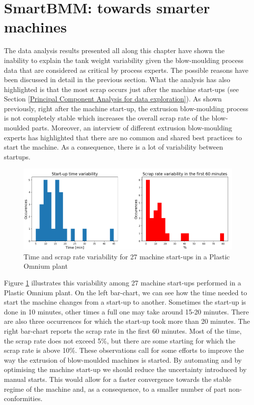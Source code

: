 \section{SmartBMM: towards smarter machines}

The data analysis results presented all along this chapter have shown the inability to explain the tank weight variability given the blow-moulding process data that are considered as critical by process experts. The possible reasons have been discussed in detail in the previous section. What the analysis has also highlighted is that the most scrap occurs just after the machine start-ups (see Section \ref{Principal Component Analysis for data exploration}). As shown previously, right after the machine start-up, the extrusion blow-moulding process is not completely stable which increases the overall scrap rate of the blow-moulded parts. Moreover, an interview of different extrusion blow-moulding experts has highlighted that there are no common and shared best practices to start the machine. As a consequence,  there is a lot of variability between startups.

\begin{figure}
\centerline{\includegraphics[scale=0.7]{images/chapter_3/smartbmm_barchart.png}}
\caption{Time and scrap rate variability for 27 machine start-ups in a Plastic Omnium plant}
\label{fig:smartbmm_barchart}
\end{figure}
%
Figure \ref{fig:smartbmm_barchart} illustrates this variability among 27 machine start-ups performed in a Plastic Omnium plant. On the left bar-chart, we can see how the time needed to start the machine changes from a start-up to another. Sometimes the start-up is done in 10 minutes, other times a full one may take around 15-20 minutes. There are also three occurrences for which the start-up took more than 20 minutes. The right bar-chart reports the scrap rate in the first 60 minutes. Most of the time, the scrap rate does not exceed 5\%, but there are some starting for which the scrap rate is above 10\%. These observations call for some efforts to improve the way the extrusion of blow-moulded machines is started. By automating and by optimising the machine start-up we should reduce the uncertainty introduced by manual starts. This would allow for a faster convergence towards the stable regime of the machine and, as a consequence, to a smaller number of part non-conformities.   

